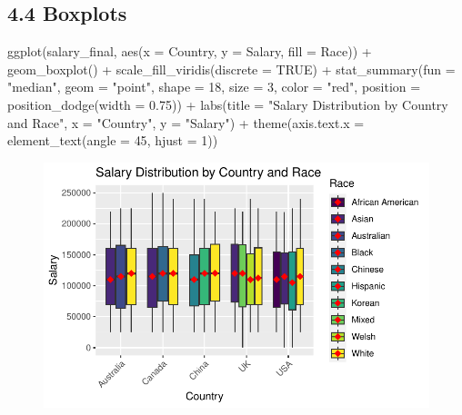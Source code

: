 \documentclass[
  letterpaper,
  DIV=11,
  numbers=noendperiod]{scrartcl}
\newenvironment{Shaded}{\begin{snugshade}}{\end{snugshade}}
\newcommand{\AttributeTok}[1]{\textcolor[rgb]{0.40,0.45,0.13}{#1}}
\newcommand{\ConstantTok}[1]{\textcolor[rgb]{0.56,0.35,0.01}{#1}}
\newcommand{\DecValTok}[1]{\textcolor[rgb]{0.68,0.00,0.00}{#1}}
\newcommand{\FloatTok}[1]{\textcolor[rgb]{0.68,0.00,0.00}{#1}}
\newcommand{\FunctionTok}[1]{\textcolor[rgb]{0.28,0.35,0.67}{#1}}
\newcommand{\NormalTok}[1]{\textcolor[rgb]{0.00,0.23,0.31}{#1}}
\newcommand{\SpecialCharTok}[1]{\textcolor[rgb]{0.37,0.37,0.37}{#1}}
\newcommand{\StringTok}[1]{\textcolor[rgb]{0.13,0.47,0.30}{#1}}
\begin{document}
\hypertarget{boxplots}{%
\subsection{4.4 Boxplots}\label{boxplots}}

\begin{Shaded}
\begin{Highlighting}[]
\FunctionTok{ggplot}\NormalTok{(salary\_final, }\FunctionTok{aes}\NormalTok{(}\AttributeTok{x =}\NormalTok{ Country, }\AttributeTok{y =}\NormalTok{ Salary, }\AttributeTok{fill =}\NormalTok{ Race)) }\SpecialCharTok{+}
  \FunctionTok{geom\_boxplot}\NormalTok{() }\SpecialCharTok{+}
  \FunctionTok{scale\_fill\_viridis}\NormalTok{(}\AttributeTok{discrete =} \ConstantTok{TRUE}\NormalTok{) }\SpecialCharTok{+}
  \FunctionTok{stat\_summary}\NormalTok{(}\AttributeTok{fun =} \StringTok{"median"}\NormalTok{, }\AttributeTok{geom =} \StringTok{"point"}\NormalTok{, }\AttributeTok{shape =} \DecValTok{18}\NormalTok{, }\AttributeTok{size =} \DecValTok{3}\NormalTok{, }\AttributeTok{color =} \StringTok{"red"}\NormalTok{, }\AttributeTok{position =} \FunctionTok{position\_dodge}\NormalTok{(}\AttributeTok{width =} \FloatTok{0.75}\NormalTok{)) }\SpecialCharTok{+}
  \FunctionTok{labs}\NormalTok{(}\AttributeTok{title =} \StringTok{"Salary Distribution by Country and Race"}\NormalTok{,}
       \AttributeTok{x =} \StringTok{"Country"}\NormalTok{,}
       \AttributeTok{y =} \StringTok{"Salary"}\NormalTok{) }\SpecialCharTok{+}
  \FunctionTok{theme}\NormalTok{(}\AttributeTok{axis.text.x =} \FunctionTok{element\_text}\NormalTok{(}\AttributeTok{angle =} \DecValTok{45}\NormalTok{, }\AttributeTok{hjust =} \DecValTok{1}\NormalTok{))  }
\end{Highlighting}
\end{Shaded}

\begin{figure}[H]

{\centering \includegraphics{main_doc_files/figure-pdf/unnamed-chunk-39-1.pdf}

}

\end{figure}
\end{document}
